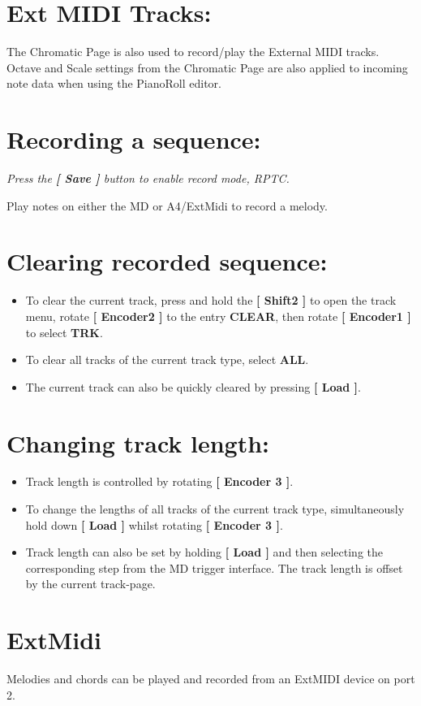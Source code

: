 \section{Ext MIDI Tracks:}
The Chromatic Page is also used to record/play the External MIDI tracks.
Octave and Scale settings from the Chromatic Page are also applied to incoming note data when using the PianoRoll editor.
\section{Recording a sequence:}
\textit{Press the \textbf{[ Save ] }button to enable record mode, RPTC.\\}

Play notes on either the MD or A4/ExtMidi to record a melody.

\section{Clearing recorded sequence:}
\begin{itemize}
\item To clear the current track, press and hold the\textbf{ [ Shift2 ]} to open the track menu, rotate \textbf{[ Encoder2 ]} to the entry \textbf{CLEAR}, then rotate \textbf{[ Encoder1 ]} to select \textbf{TRK}.
\item To clear all tracks of the current track type, select \textbf{ALL}.
\item The current track can also be quickly cleared by pressing \textbf{[ Load ]}.
\end{itemize}

\section{Changing track length:}
\begin{itemize}
\item Track length is controlled by rotating \textbf{[ Encoder 3 ]}.
\item To change the lengths of all tracks of the current track type, simultaneously hold down \textbf{[ Load ]} whilst rotating \textbf{[ Encoder 3 ]}.
\item Track length can also be set by holding \textbf{[ Load ]} and then selecting the corresponding step from the MD trigger interface. The track length is offset by the current track-page.
\end{itemize}


\section{ExtMidi}
Melodies and chords can be played and recorded from an ExtMIDI device on port 2.
\\

